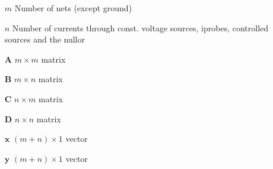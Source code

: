 \documentclass{article}[11pt]
\begin{document}
\begin{itemize}
\item[$m$] Number of nets (except ground)
\item[$n$] Number of currents through const. voltage sources, iprobes, controlled sources and the nullor
\item[$\mathbf{A}$] $m  \times m$ matrix
\item[$\mathbf{B}$] $m  \times n$ matrix
\item[$\mathbf{C}$] $n  \times m$ matrix
\item[$\mathbf{D}$] $n  \times n$ matrix
\item[$\mathbf{x}$] $(m+n) \times 1$ vector
\item[$\mathbf{y}$] $(m+n) \times 1$ vector
\end{itemize}


\newpage
\end{document}
